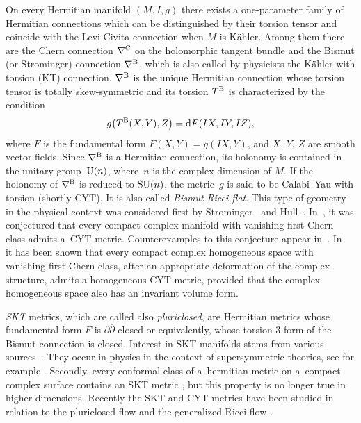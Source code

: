 On every Hermitian manifold $(M, I, g)$ there exists a one-parameter family of Hermitian connections which can be distinguished by their torsion tensor and coincide with the Levi-Civita connection when $M$ is K\"ahler. Among them there are
the Chern connection $\nabla^{\rm C}$ on the holomorphic tangent bundle and the Bismut (or Strominger) connection $\nabla^{\rm B}$, which is also called by physicists the K\"ahler with torsion (KT) connection. $\nabla^{\rm B}$ is the unique Hermitian connection whose torsion tensor is totally skew-symmetric and its torsion $T^{\rm B}$ is characterized by the condition
\[
g \big(T^{\rm B}(X,Y), Z\big) = {\rm d}F(IX,IY,IZ),
\]
where $F$ is the fundamental form $F(X,Y) = g(IX,Y)$, and $X$, $Y$, $Z$ are smooth vector fields. Since $\nabla^{\rm B}$ is a Hermitian connection, its holonomy is contained in the unitary group~${\rm U}(n)$, where~$n$ is the complex dimension of $M$. If the holonomy of $\nabla^{\rm B}$ is reduced to ${\rm SU}(n)$, the metric~$g$
is said to be Calabi--Yau with torsion (shortly CYT). It is also called {\it Bismut Ricci-flat}.
This type of geometry in the physical context was considered first by Strominger~\cite{Strominger} and
Hull~\cite{Hull}. In~\cite{GIP}, it was conjectured that every compact complex manifold with vanishing first Chern class admits a~CYT metric. Counterexamples to this conjecture appear in~\cite{FG}. In~\cite{Grantcharov} it has been shown that every compact complex homogeneous space with vanishing first Chern class, after an appropriate deformation of the complex structure, admits a homogeneous CYT metric, provided that the complex homogeneous space also has an invariant volume form.

{\em SKT} metrics, which are called also {\em pluriclosed}, are Hermitian metrics whose fundamental form $F$ is $\partial \overline \partial$-closed or equivalently, whose torsion $3$-form of the Bismut connection is closed. Interest in SKT manifolds stems from various sources~\cite{Swann}. They occur in physics in the context of supersymmetric theories, see for example \cite{GHR,HP,Strominger}. Secondly, every conformal class of a~hermitian metric on a~compact complex surface contains an SKT metric \cite{Gau}, but this property is no longer true in higher dimensions. Recently the SKT and CYT metrics have been studied in relation to the pluriclosed flow and the generalized Ricci flow \cite{AFSU, Barbaro, GJS, GS}.
